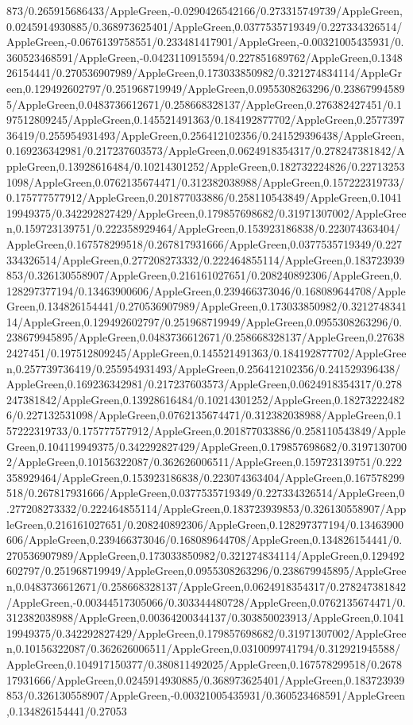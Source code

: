{\begin{tikzternal}
{873/0.265915686433/AppleGreen,-0.0290426542166/0.273315749739/AppleGreen,0.0245914930885/0.368973625401/AppleGreen,0.0377535719349/0.227334326514/AppleGreen,-0.0676139758551/0.233481417901/AppleGreen,-0.00321005435931/0.360523468591/AppleGreen,-0.0423110915594/0.227851689762/AppleGreen,0.134826154441/0.270536907989/AppleGreen,0.173033850982/0.321274834114/AppleGreen,0.129492602797/0.251968719949/AppleGreen,0.0955308263296/0.238679945895/AppleGreen,0.0483736612671/0.258668328137/AppleGreen,0.276382427451/0.197512809245/AppleGreen,0.145521491363/0.184192877702/AppleGreen,0.257739736419/0.255954931493/AppleGreen,0.256412102356/0.241529396438/AppleGreen,0.169236342981/0.217237603573/AppleGreen,0.0624918354317/0.278247381842/AppleGreen,0.13928616484/0.10214301252/AppleGreen,0.182732224826/0.227132531098/AppleGreen,0.0762135674471/0.312382038988/AppleGreen,0.157222319733/0.175777577912/AppleGreen,0.201877033886/0.258110543849/AppleGreen,0.104119949375/0.342292827429/AppleGreen,0.179857698682/0.31971307002/AppleGreen,0.159723139751/0.222358929464/AppleGreen,0.153923186838/0.223074363404/AppleGreen,0.167578299518/0.267817931666/AppleGreen,0.0377535719349/0.227334326514/AppleGreen,0.277208273332/0.222464855114/AppleGreen,0.183723939853/0.326130558907/AppleGreen,0.216161027651/0.208240892306/AppleGreen,0.128297377194/0.13463900606/AppleGreen,0.239466373046/0.168089644708/AppleGreen,0.134826154441/0.270536907989/AppleGreen,0.173033850982/0.321274834114/AppleGreen,0.129492602797/0.251968719949/AppleGreen,0.0955308263296/0.238679945895/AppleGreen,0.0483736612671/0.258668328137/AppleGreen,0.276382427451/0.197512809245/AppleGreen,0.145521491363/0.184192877702/AppleGreen,0.257739736419/0.255954931493/AppleGreen,0.256412102356/0.241529396438/AppleGreen,0.169236342981/0.217237603573/AppleGreen,0.0624918354317/0.278247381842/AppleGreen,0.13928616484/0.10214301252/AppleGreen,0.182732224826/0.227132531098/AppleGreen,0.0762135674471/0.312382038988/AppleGreen,0.157222319733/0.175777577912/AppleGreen,0.201877033886/0.258110543849/AppleGreen,0.104119949375/0.342292827429/AppleGreen,0.179857698682/0.31971307002/AppleGreen,0.10156322087/0.362626006511/AppleGreen,0.159723139751/0.222358929464/AppleGreen,0.153923186838/0.223074363404/AppleGreen,0.167578299518/0.267817931666/AppleGreen,0.0377535719349/0.227334326514/AppleGreen,0.277208273332/0.222464855114/AppleGreen,0.183723939853/0.326130558907/AppleGreen,0.216161027651/0.208240892306/AppleGreen,0.128297377194/0.13463900606/AppleGreen,0.239466373046/0.168089644708/AppleGreen,0.134826154441/0.270536907989/AppleGreen,0.173033850982/0.321274834114/AppleGreen,0.129492602797/0.251968719949/AppleGreen,0.0955308263296/0.238679945895/AppleGreen,0.0483736612671/0.258668328137/AppleGreen,0.0624918354317/0.278247381842/AppleGreen,-0.00344517305066/0.303344480728/AppleGreen,0.0762135674471/0.312382038988/AppleGreen,0.00364200344137/0.303850023913/AppleGreen,0.104119949375/0.342292827429/AppleGreen,0.179857698682/0.31971307002/AppleGreen,0.10156322087/0.362626006511/AppleGreen,0.0310099741794/0.312921945588/AppleGreen,0.104917150377/0.380811492025/AppleGreen,0.167578299518/0.267817931666/AppleGreen,0.0245914930885/0.368973625401/AppleGreen,0.183723939853/0.326130558907/AppleGreen,-0.00321005435931/0.360523468591/AppleGreen,0.134826154441/0.27053}
\end{tikzternal}}
